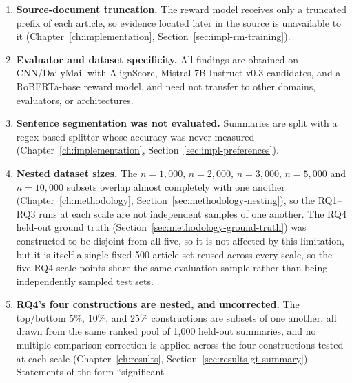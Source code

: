 \begin{enumerate}
    two candidates differ in decoding temperature, and the lower-temperature
    candidate is preferred substantially more often under both conditions and to
    differing degrees (Chapter~\ref{ch:methodology},
    Section~\ref{sec:methodology-ethics}). Summary length and sentence count are
    excluded as carriers of this information, both performing at chance against
    the evaluator's decisions (Table~\ref{tab:surface-baselines}), but subtler
    temperature-correlated textual features were not tested and could still
    carry part of the label information.
  \item \label{lim:truncation}
    \textbf{Source-document truncation.} The reward model receives only a
    truncated prefix of each article, so evidence located later in the source is
    unavailable to it (Chapter~\ref{ch:implementation},
    Section~\ref{sec:impl-rm-training}).
  \item \textbf{Evaluator and dataset specificity.} All findings are obtained on
    CNN/DailyMail with AlignScore, Mistral-7B-Instruct-v0.3 candidates, and a
    RoBERTa-base reward model, and need not transfer to other domains,
    evaluators, or architectures.
  \item \textbf{Sentence segmentation was not evaluated.} Summaries are split
    with a regex-based splitter whose accuracy was never measured
    (Chapter~\ref{ch:implementation}, Section~\ref{sec:impl-preferences}).
  \item \textbf{Nested dataset sizes.} The $n=1{,}000$, $n=2{,}000$, $n=3{,}000$,
    $n=5{,}000$ and $n=10{,}000$ subsets overlap almost completely with one
    another (Chapter~\ref{ch:methodology}, Section~\ref{sec:methodology-nesting}),
    so the RQ1--RQ3 runs at each scale are not independent samples of one
    another. The RQ4 held-out ground truth (Section~\ref{sec:methodology-ground-truth})
    was constructed to be disjoint from all five, so it is not affected by this
    limitation, but it is itself a single fixed 500-article set reused across
    every scale, so the five RQ4 scale points share the same evaluation sample
    rather than being independently sampled test sets.
  \item \textbf{RQ4's four constructions are nested, and uncorrected.} The
    top/bottom 5\%, 10\%, and 25\% constructions are subsets of one another,
    all drawn from the same ranked pool of 1{,}000 held-out summaries, and no
    multiple-comparison correction is applied across the four constructions
    tested at each scale (Chapter~\ref{ch:results},
    Section~\ref{sec:results-gt-summary}). Statements of the form ``significant

\end{enumerate}
